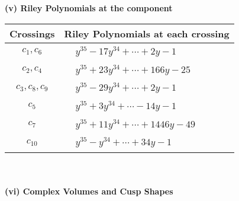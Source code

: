\documentclass[1p]{elsarticle_modified}
\theoremstyle{definition}
\begin{document}
\newpage\renewcommand{\arraystretch}{1}
\flushleft \textbf{(v) Riley Polynomials at the component}\newline \\
\begin{tabular}{m{50pt}|m{274pt}}
Crossings & \hspace{64pt}Riley Polynomials at each crossing \\
\hline $$\begin{aligned}c_{1},c_{6}\end{aligned}$$&$\begin{aligned}
&y^{35}-17 y^{34}+\cdots+2 y-1
\end{aligned}$\\
\hline $$\begin{aligned}c_{2},c_{4}\end{aligned}$$&$\begin{aligned}
&y^{35}+23 y^{34}+\cdots+166 y-25
\end{aligned}$\\
\hline $$\begin{aligned}c_{3},c_{8},c_{9}\end{aligned}$$&$\begin{aligned}
&y^{35}-29 y^{34}+\cdots+2 y-1
\end{aligned}$\\
\hline $$\begin{aligned}c_{5}\end{aligned}$$&$\begin{aligned}
&y^{35}+3 y^{34}+\cdots-14 y-1
\end{aligned}$\\
\hline $$\begin{aligned}c_{7}\end{aligned}$$&$\begin{aligned}
&y^{35}+11 y^{34}+\cdots+1446 y-49
\end{aligned}$\\
\hline $$\begin{aligned}c_{10}\end{aligned}$$&$\begin{aligned}
&y^{35}- y^{34}+\cdots+34 y-1
\end{aligned}$\\
\hline
\end{tabular}\\~\\
\newpage\flushleft \textbf{(vi) Complex Volumes and Cusp Shapes}
\end{document}
